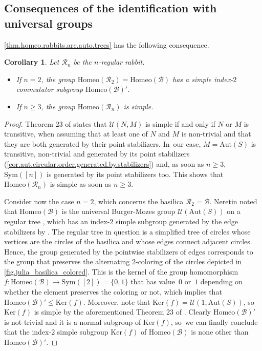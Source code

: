 \documentclass[JEP,XML,SOM,Unicode,NoFloatCountersInSection,published]{cedram}
\theoremstyle{plain}
\newtheorem{corollary}[theorem]{Corollary}
\theoremstyle{definition}
\theoremstyle{remark}
\newcommand{\Aut}{\mathrm{Aut}}
\newcommand{\Sym}{\mathrm{Sym}}
\newcommand{\Homeo}{\mathrm{Homeo}}
\newcommand{\B}{\mathcal{B}}
\newcommand{\R}{\mathcal{R}}
\newcommand{\U}{\mathcal{U}}
\begin{document}
\subsection{Consequences of the identification with universal groups}\label{sec.consequenses.identification.rabbit}

\cref{thm.homeo.rabbits.are.auto.trees} has the following consequence.

\begin{corollary}
\label{cor.rabbits.simple}
Let $\R_n$ be the $n$-regular rabbit.
\begin{itemize}
\item If $n=2$, the group $\Homeo(\R_2) = \Homeo(\B)$ has a simple index-$2$ commutator subgroup $\Homeo(\B)'$.
\item If $n \geq 3$, the group $\Homeo(\R_n)$ is simple.
\end{itemize}
\end{corollary}

\begin{proof}
Theorem 23 of \cite{biregular} states that $\U(N,M)$ is simple if and only if $N$ or $M$ is transitive, when assuming that at least one of $N$ and $M$ is non-trivial and that they are both generated by their point stabilizers. In~our case, $M = \Aut(S)$ is transitive, non-trivial and generated by its point stabilizers (\cref{cor.aut.circular.order.generated.by.stabilizers}) and, as soon as $n \geq 3$, $\Sym([n])$ is generated by its point stabilizers too.
This shows that $\Homeo(\R_n)$ is simple as soon as $n \geq 3$.

Consider now the case $n=2$, which concerns the basilica $\R_2 = \B$.
Neretin noted that $\Homeo(\B)$ is the universal Burger-Mozes group $\U(\Aut(S))$ on a regular tree \cite{Neretin}, which has an index-$2$ simple subgroup generated by the edge stabilizers by \cite[Prop.\,3.2.1]{BM00}.
The regular tree in question is a simplified tree of circles whose vertices are the circles of the basilica and whose edges connect adjacent circles.
Hence, the group generated by the pointwise stabilizers of edges corresponds to the group that preserves the alternating $2$-coloring of the circles depicted in \cref{fig.julia_basilica_colored}.
This is the kernel of the group homomorphism $f \colon \Homeo(\B) \to \Sym([2]) = \{0,1\}$ that has value~$0$ or~$1$ depending on whether the element preserves the coloring or not, which implies that $\Homeo(\B)' \leq \mathrm{Ker}(f)$.
Moreover, note that $\mathrm{Ker}(f) = \U(1,\Aut(S))$, so~$\mathrm{Ker}(f)$ is simple by the aforementioned Theorem 23 of \cite{biregular}.
Clearly $\Homeo(\B)'$ is not trivial and it is a normal subgroup of $\mathrm{Ker}(f)$, so~we can finally conclude that the index-$2$ simple subgroup $\mathrm{Ker}(f)$ of $\Homeo(\B)$ is none other than $\Homeo(\B)'$.
\end{proof}
\end{document}
